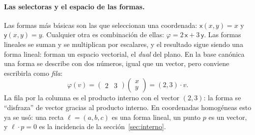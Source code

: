 \begin{center}
\end{center}

\paragraph{Las selectoras y el espacio de las formas.} Las formas más básicas son las que
seleccionan una coordenada: \(\mathsf{x}(x,y)=x\) y \(\mathsf{y}(x,y)=y\). Cualquier otra
es combinación de ellas: \(\varphi=2\,\mathsf{x}+3\,\mathsf{y}\). Las formas lineales se
suman y se multiplican por escalares, y el resultado sigue siendo una forma lineal: forman
un espacio vectorial, el \emph{dual} del plano. En la base canónica una forma se describe
con dos números, igual que un vector, pero conviene escribirla como \emph{fila}:
\[
  \varphi(v)=\begin{pmatrix}2&3\end{pmatrix}\begin{pmatrix}x\\y\end{pmatrix}
  =(2,3)\cdot v .
\]
La fila por la columna es el producto interno con el vector \((2,3)\): la forma se
``disfraza'' de vector gracias al producto interno. En coordenadas homogéneas esto ya se
usó: una recta \(\ell=(a,b,c)\) es una forma lineal, un punto \(p\) es un vector, y
\(\ell\cdot p=0\) es la incidencia de la sección~\ref{sec:interno}.

